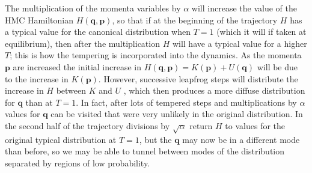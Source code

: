 \documentclass[12pt]{article}
\begin{document}
    The multiplication of the momenta variables by $\alpha$ will increase the value of the HMC Hamiltonian $H\left(\bm{q},\bm{p}\right)$, so that if at the beginning of the trajectory $H$ has a typical value for the canonical distribution when $T=1$ (which it will if taken at equilibrium), then after the multiplication $H$ will have a typical value for a higher $T$; this is how the tempering is incorporated into the dynamics. As the momenta $\bm{p}$ are increased the initial increase in $H\left(\bm{q},\bm{p}\right) = K\left(\bm{p}\right) + U\left(\bm{q}\right)$  will be due to the increase in $K\left(\bm{p}\right)$. However, successive leapfrog steps will distribute the increase in $H$ between $K$ and $U$ \cite{neal_2011}, which then produces a more diffuse distribution for $\bm{q}$ than at $T=1$. In fact, after lots of tempered steps and multiplications by $\alpha$ values for $\bm{q}$ can be visited that were very unlikely in the original distribution. In the second half of the trajectory divisions by $\sqrt{\alpha}$ return $H$ to values for the original typical distribution at $T=1$, but the $\bm{q}$ may now be in  a different mode than before, so we may be able to tunnel between modes of the distribution separated by regions of low probability.
\end{document}
